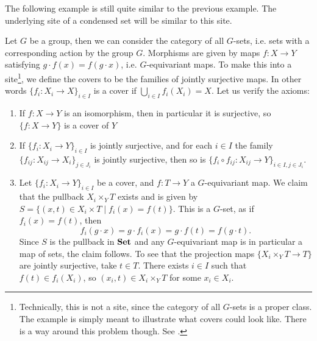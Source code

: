 \documentclass{article}
\begin{document}
The following example is still quite similar to the previous
example. The underlying site of a condensed set will be similar
to this site.
\begin{example}
    Let $G$ be a group, then we can consider the category
    of all $G$-sets, i.e. sets with a corresponding action
    by the group $G$. Morphisms are given by maps $f \colon X \to Y$
    satisfying $g\cdot f(x) = f(g\cdot x)$, i.e. $G$-equivariant
    maps. To make this into a site\footnote{
        Technically, this is not a site, since the category
        of all $G$-sets is a proper class. The example is
        simply meant to illustrate what covers could look like.
        There is a way around this problem though. See
        \cite[\href{https://stacks.math.columbia.edu/tag/00VK}{Example 00VK}]{stacks-project}.
    }, we define the covers to be the
    families of jointly surjective maps. In other words
    $\{f_i \colon X_i \to X\}_{i\in I}$ is a cover if
    $\bigcup_{i\in I}f_i(X_i) = X$. Let us verify the axioms:
    \begin{enumerate}
        \item If $f \colon X \to Y$ is an isomorphism, then
              in particular it is surjective, so $\{f \colon X \to Y\}$ is a cover
              of $Y$
        \item If $\{f_i \colon X_i \to Y\}_{i\in I}$ is jointly surjective, and
              for each $i\in I$ the family $\{f_{ij} \colon X_{ij} \to X_i\}_{j\in J_i}$ is jointly
              surjective, then so is $\{f_i \circ f_{ij}\colon X_{ij} \to Y\}_{i\in I, j\in J_i}$.
        \item Let $\{f_i \colon X_i \to Y\}_{i\in I}$ be a cover,
              and $f\colon T \to Y$ a $G$-equivariant map. We claim that the pullback
              $X_i \times_Y T$ exists and is given by
              $S = \{(x,t)\in X_i \times T \mid f_i(x) = f(t)\}$.
              This is a $G$-set, as if $f_i(x) = f(t)$, then
              \begin{equation*}
                  f_i(g\cdot x) = g\cdot f_i(x) = g\cdot f(t) = f(g \cdot t).
              \end{equation*}
              Since $S$ is the pullback in $\operatorname{\mathbf{Set}}$ and any $G$-equivariant map
              is in particular a map of sets, the claim follows.
              To see that the projection maps $\{X_i \times_Y T \to T\}$
              are jointly surjective, take $t\in T$. There exists $i\in I$
              such that $f(t) \in f_i(X_i)$, so $(x_i, t) \in X_i \times_Y T$
              for some $x_i \in X_i$.
    \end{enumerate}
\end{example}
\end{document}
